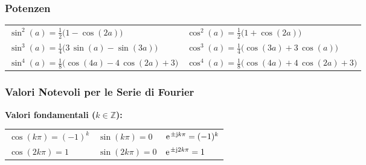 \subsubsection{Potenzen}

\begin{tabular}{ll}
    $\sin^2(a) = \frac{1}{2} \big(1-\cos(2a) \big)$                   & $\cos^2(a) = \frac{1}{2} \big(1+\cos(2a) \big)$                     \\	
    $\sin^3(a) = \frac{1}{4} \big(3\, \sin(a) - \sin(3a) \big)$       & $\cos^3(a) = \frac{1}{4} \big(\cos(3a) + 3 \, \cos(a) \big)$        \\	
    $\sin^4(a) = \frac{1}{8} \big(\cos(4a) -4 \, \cos(2a) +3 \big)$   & $\cos^4(a) = \frac{1}{8} \big(\cos(4a) + 4 \, \cos(2a) +3 \big)$
\end{tabular}


\subsubsection{Valori Notevoli per le Serie di Fourier}

\noindent\textbf{Valori fondamentali ($k \in \mathbb{Z}$):}
\begin{center}
\begin{tabular}{lll}
    $\cos(k\pi) = (-1)^k$ & $\sin(k\pi) = 0$ & $\e^{\pm\jimg k\pi} = (-1)^k$ \\
    $\cos(2k\pi) = 1$     & $\sin(2k\pi) = 0$    & $\e^{\pm\jimg 2k\pi} = 1$
\end{tabular}
\end{center}


